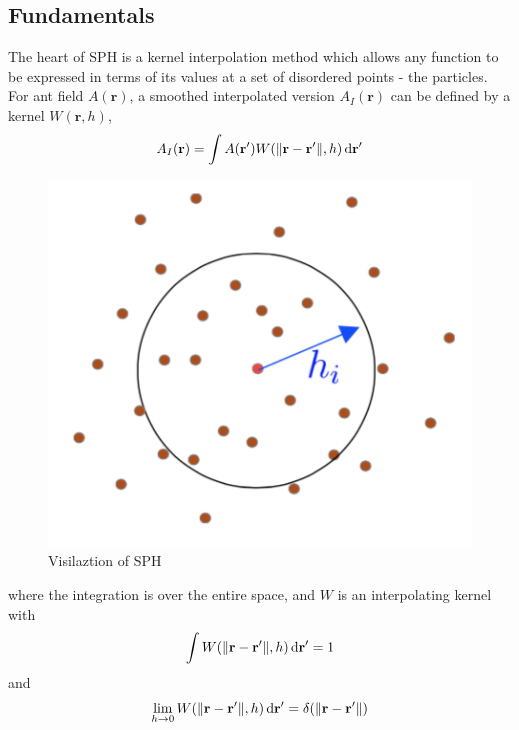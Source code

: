     \subsection{Fundamentals}

    The heart of SPH is a kernel interpolation method which allows any function to be expressed in terms of its values at a set of disordered points - the particles\cite{monaghan1992smoothed}. For ant field $A(\textbf{r})$, a smoothed interpolated version $A_{I}(\textbf{r})$ can be defined by a kernel $W(\textbf{r}, h)$,
    \begin{equation}
        A_{I}(\textbf{r}) = \int A({\textbf{r}}^{\prime})W(\|\textbf{r} - \textbf{r}^{\prime}\|, h)\,\mathrm{d}\textbf{r}^{\prime}
    \end{equation}
    \begin{figure}[!ht]
        \centering
        \includegraphics[scale = 0.6]{Figures/sph}
        \caption{Visilaztion of SPH}
    \end{figure}

    where the integration is over the entire space, and $W$ is an interpolating kernel with 
    \begin{equation}
        \int W(\|\textbf{r} - \textbf{r}^{\prime}\|, h)\,\mathrm{d} \textbf{r}^{\prime} = 1
    \end{equation}
    and
    \begin{equation}
        \lim_{h\to 0} W(\|\textbf{r} - \textbf{r}^{\prime}\|, h)\,\mathrm{d}\textbf{r}^{\prime} = \delta(\|\textbf{r} - \textbf{r}^{\prime}\|) 
    \end{equation}

